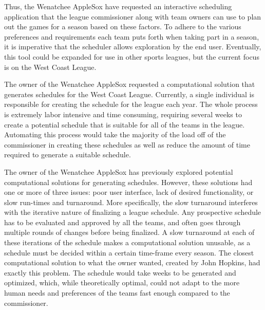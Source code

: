 \documentclass[book]{hmcclinic}
\begin{document}
Thus, the Wenatchee AppleSox have requested an interactive scheduling application that the league commissioner along with team owners can use to plan out the games for a season based on these factors. To adhere to the various preferences and requirements each team puts forth when taking part in a season, it is imperative that the scheduler allows exploration by the end user. Eventually, this tool could be expanded for use in other sports leagues, but the current focus is on the West Coast League. 

The owner of the Wenatchee AppleSox requested a computational solution that generates schedules for the West Coast League. Currently, a single individual is responsible for creating the schedule for the league each year. The whole process is extremely labor intensive and time consuming, requiring several weeks to create a potential schedule that is suitable for all of the teams in the league. Automating this process would take the majority of the load off of the commissioner in creating these schedules as well as reduce the amount of time required to generate a suitable schedule.



The owner of the Wenatchee AppleSox has previously explored potential computational solutions for generating schedules. However, these solutions had one or more of three issues: poor user interface, lack of desired functionality, or slow run-times and turnaround. More specifically, the slow turnaround interferes with the iterative nature of finalizing a league schedule. Any prospective schedule has to be evaluated and approved by all the teams, and often goes through multiple rounds of changes before being finalized. A slow turnaround at each of these iterations of the schedule makes a computational solution unusable, as a schedule must be decided within a certain time-frame every season. The closest computational solution to what the owner wanted, created by John Hopkins, had exactly this problem. The schedule would take weeks to be generated and optimized, which, while theoretically optimal, could not adapt to the more human needs and preferences of the teams fast enough compared to the commissioner.
\end{document}
